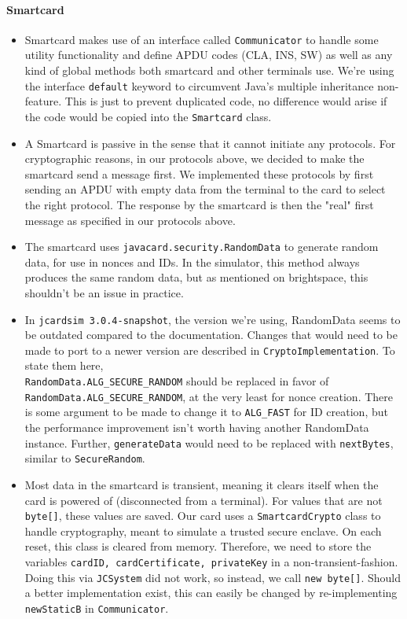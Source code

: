 \documentclass[a4paper]{article}
\begin{document}
\paragraph{Smartcard}
\begin{itemize}
    \item Smartcard makes use of an interface called \texttt{Communicator} to handle some utility functionality and define APDU codes (CLA, INS, SW) as well as any kind of global methods both smartcard and other terminals use. We're using the interface \texttt{default} keyword to circumvent Java's multiple inheritance non-feature. This is just to prevent duplicated code, no difference would arise if the code would be copied into the \texttt{Smartcard} class.
    \item A Smartcard is passive in the sense that it cannot initiate any protocols. For cryptographic reasons, in our protocols above, we decided to make the smartcard send a message first. We implemented these protocols by first sending an APDU with empty data from the terminal to the card to select the right protocol. The response by the smartcard is then the "real" first message as specified in our protocols above.
    \item The smartcard uses \texttt{javacard.security.RandomData} to generate random data, for use in nonces and IDs. In the simulator, this method always produces the same random data, but as mentioned on brightspace, this shouldn't be an issue in practice. 
    \item In \texttt{jcardsim 3.0.4-snapshot}, the version we're using, RandomData seems to be outdated compared to the documentation. Changes that would need to be made to port to a newer version are described in \texttt{CryptoImplementation}. To state them here, \\\texttt{RandomData.ALG\_SECURE\_RANDOM} should be replaced in favor of \texttt{RandomData.ALG\_SECURE\_RANDOM}, at the very least for nonce creation. There is some argument to be made to change it to \texttt{ALG\_FAST} for ID creation, but the performance improvement isn't worth having another RandomData instance. Further, \texttt{generateData} would need to be replaced with \texttt{nextBytes}, similar to \texttt{SecureRandom}.
    \item Most data in the smartcard is transient, meaning it clears itself when the card is powered of (disconnected from a terminal). For values that are not \texttt{byte[]}, these values are saved. Our card uses a \texttt{SmartcardCrypto} class to handle cryptography, meant to simulate a trusted secure enclave. On each reset, this class is cleared from memory. Therefore, we need to store the variables \texttt{cardID, cardCertificate, privateKey} in a non-transient-fashion. Doing this via \texttt{JCSystem} did not work, so instead, we call \texttt{new byte[]}. Should a better implementation exist, this can easily be changed by re-implementing \texttt{newStaticB} in \texttt{Communicator}.

\end{itemize}
\end{document}
